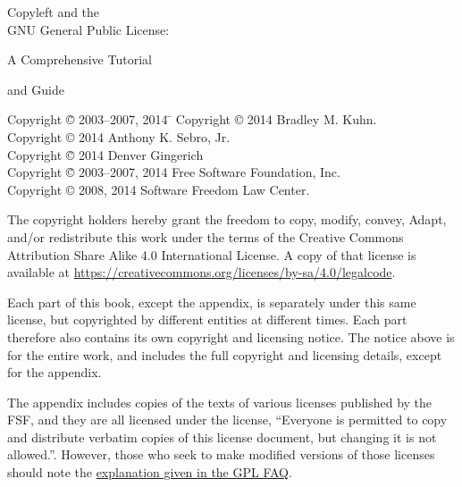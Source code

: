 \documentclass[10pt, letterpaper, openany, oneside]{book}
\begin{document}
\pagestyle{plain}

\frontmatter

\begin{titlepage}

\begin{center}

{\Huge
{\sc Copyleft and the  \\

GNU General Public License:

\vspace{.25in}

A Comprehensive Tutorial \\

\vspace{.1in}

and Guide
}}
\vfill

{\parindent 0in
\begin{tabbing}
Copyright \= \copyright{} 2003--2007, 2014 \hspace{1.mm} \=  \kill
Copyright \> \copyright{} 2014 \>  Bradley M. Kuhn. \\
Copyright \> \copyright{} 2014 \>  Anthony K. Sebro, Jr. \\
Copyright \= \copyright{} 2014 \> Denver Gingerich \\
Copyright \= \copyright{} 2003--2007, 2014 \> \hspace{.2in} Free Software Foundation, Inc. \\
Copyright \> \copyright{} 2008, 2014 \>  Software Freedom Law Center. \\
\end{tabbing}

\vspace{.3in}

The copyright holders hereby grant the freedom to copy, modify, convey,
Adapt, and/or redistribute this work under the terms of the Creative Commons
Attribution Share Alike 4.0 International License.  A copy of that license is
available at \url{https://creativecommons.org/licenses/by-sa/4.0/legalcode}.

Each part of this book, except the appendix, is separately under this same
license, but copyrighted by different entities at different times.  Each part
therefore also contains its own copyright and licensing notice.  The notice
above is for the entire work, and includes the full copyright and licensing
details, except for the appendix.

The appendix includes copies of the texts of various licenses published
by the FSF, and they are all licensed under the license, ``Everyone is permitted
to copy and distribute verbatim copies of this license document, but changing
it is not allowed.''.  However, those who seek to make modified versions of
those licenses should note the
\href{https://www.gnu.org/licenses/gpl-faq.html#ModifyGPL}{explanation given in the GPL FAQ}.

}
\end{center}
\end{titlepage}
\end{document}
